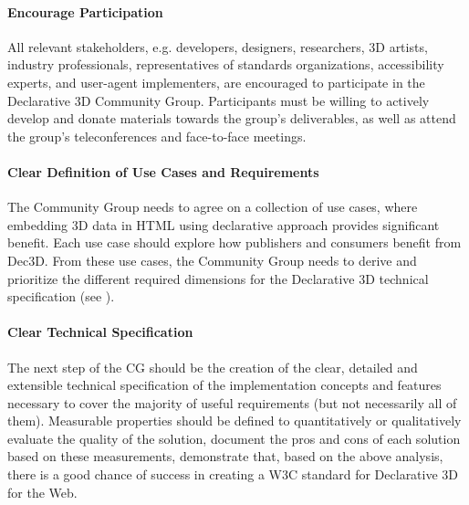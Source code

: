 \documentclass[review]{acmsiggraph}
\begin{document}
\paragraph{Encourage Participation}
All relevant stakeholders, e.g. developers, designers, researchers, 3D artists, industry professionals, representatives of standards organizations, accessibility experts, and user-agent implementers, are encouraged to participate in the Declarative 3D Community Group. Participants must be willing to actively develop and donate materials towards the group's deliverables, as well as attend the group's teleconferences and face-to-face meetings.

\paragraph{Clear Definition of Use Cases and Requirements}
The Community Group needs to agree on a collection of use cases, where embedding 3D data in HTML using declarative approach provides significant benefit. Each use case should explore how publishers and consumers benefit from Dec3D. From these use cases, the Community Group needs to derive and prioritize the different required dimensions for the Declarative 3D technical specification (see \cite{JankowskiDec3D2012,LeFeuvreDec3D2012}).

\paragraph{Clear Technical Specification}
The next step of the CG should be the creation of the clear, detailed and extensible technical specification of the implementation concepts and features necessary to cover the majority of useful requirements (but not necessarily all of them). Measurable properties should be defined to quantitatively or qualitatively evaluate the quality of the solution, document the pros and cons of each solution based on these measurements, demonstrate that, based on the above analysis, there is a good chance of success in creating a W3C standard for Declarative 3D for the Web.
\end{document}

